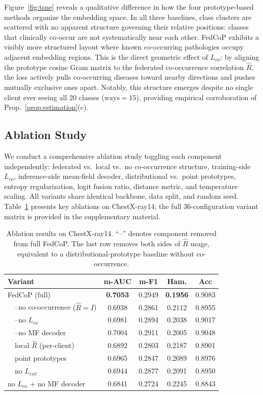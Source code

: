 \documentclass[conference]{IEEEtran}
\theoremstyle{definition}
\newcommand{\Rhat}{\widehat{R}}
\begin{document}
Figure~\ref{fig:tsne} reveals a qualitative difference in how the four prototype-based methods organize the embedding space. In all three baselines, class clusters are scattered with no apparent structure governing their relative positions: classes that clinically co-occur are not systematically near each other. FedCoP exhibits a visibly more structured layout where known co-occurring pathologies occupy adjacent embedding regions. This is the direct geometric effect of $L_{co}$: by aligning the prototype cosine Gram matrix to the federated co-occurrence correlation $\Rhat$, the loss actively pulls co-occurring diseases toward nearby directions and pushes mutually exclusive ones apart. Notably, this structure emerges despite no single client ever seeing all 20 classes ($\text{ways}{=}15$), providing empirical corroboration of Prop.~\ref{prop:estimation}(c).

\subsection{Ablation Study}
\label{sec:ablation}

We conduct a comprehensive ablation study toggling each component independently: federated vs.\ local vs.\ no co-occurrence structure, training-side $L_{co}$, inference-side mean-field decoder, distributional vs.\ point prototypes, entropy regularization, logit fusion ratio, distance metric, and temperature scaling. All variants share identical backbone, data split, and random seed. Table~\ref{tab:ablation} presents key ablations on ChestX-ray14; the full 36-configuration variant matrix is provided in the supplementary material.

\begin{table}[t]
\centering
\caption{Ablation results on ChestX-ray14. ``--'' denotes component removed from full FedCoP. The last row removes both sides of $\Rhat$ usage, equivalent to a distributional-prototype baseline without co-occurrence.}
\label{tab:ablation}
\footnotesize
\setlength{\tabcolsep}{3pt}
\begin{tabular}{lcccc}
\toprule
Variant & m-AUC & m-F1 & Ham. & Acc \\
\midrule
FedCoP (full)                  & \textbf{0.7053} & 0.2949 & \textbf{0.1956} & 0.9083 \\
~~--no co-occurrence ($\Rhat{=}I$) & 0.6938 & 0.2861 & 0.2112 & 0.8955 \\
~~--no $L_{co}$                 & 0.6981 & 0.2894 & 0.2038 & 0.9017 \\
~~--no MF decoder              & 0.7004 & 0.2911 & 0.2005 & 0.9048 \\
~~local $\Rhat$ (per-client)   & 0.6892 & 0.2803 & 0.2187 & 0.8901 \\
~~point prototypes             & 0.6965 & 0.2847 & 0.2089 & 0.8976 \\
~~no $L_{ent}$                 & 0.6944 & 0.2877 & 0.2091 & 0.8950 \\
\midrule
no $L_{co}$ + no MF decoder    & 0.6841 & 0.2724 & 0.2245 & 0.8843 \\
\bottomrule
\end{tabular}
\end{table}
\end{document}
